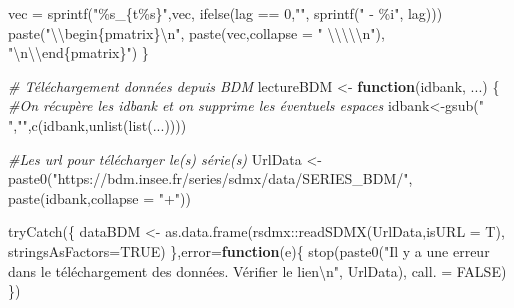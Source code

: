 \documentclass[
  10pt,
]{article}
\newenvironment{Shaded}{\begin{snugshade}}{\end{snugshade}}
\newcommand{\AttributeTok}[1]{\textcolor[rgb]{0.77,0.63,0.00}{#1}}
\newcommand{\CommentTok}[1]{\textcolor[rgb]{0.56,0.35,0.01}{\textit{#1}}}
\newcommand{\ConstantTok}[1]{\textcolor[rgb]{0.00,0.00,0.00}{#1}}
\newcommand{\ControlFlowTok}[1]{\textcolor[rgb]{0.13,0.29,0.53}{\textbf{#1}}}
\newcommand{\DecValTok}[1]{\textcolor[rgb]{0.00,0.00,0.81}{#1}}
\newcommand{\FunctionTok}[1]{\textcolor[rgb]{0.00,0.00,0.00}{#1}}
\newcommand{\NormalTok}[1]{#1}
\newcommand{\OtherTok}[1]{\textcolor[rgb]{0.56,0.35,0.01}{#1}}
\newcommand{\SpecialCharTok}[1]{\textcolor[rgb]{0.00,0.00,0.00}{#1}}
\newcommand{\StringTok}[1]{\textcolor[rgb]{0.31,0.60,0.02}{#1}}
\begin{document}
\begin{Shaded}
\begin{Highlighting}[]
\NormalTok{    vec }\OtherTok{=} \FunctionTok{sprintf}\NormalTok{(}\StringTok{"\%s\_\{t\%s\}"}\NormalTok{,vec,}
                  \FunctionTok{ifelse}\NormalTok{(lag }\SpecialCharTok{==} \DecValTok{0}\NormalTok{,}\StringTok{""}\NormalTok{,}
                         \FunctionTok{sprintf}\NormalTok{(}\StringTok{" {-} \%i"}\NormalTok{, lag)))}
    \FunctionTok{paste}\NormalTok{(}\StringTok{"}\SpecialCharTok{\textbackslash{}\textbackslash{}}\StringTok{begin\{pmatrix\}}\SpecialCharTok{\textbackslash{}n}\StringTok{"}\NormalTok{,}
          \FunctionTok{paste}\NormalTok{(vec,}\AttributeTok{collapse =} \StringTok{" }\SpecialCharTok{\textbackslash{}\textbackslash{}\textbackslash{}\textbackslash{}\textbackslash{}n}\StringTok{"}\NormalTok{),}
          \StringTok{"}\SpecialCharTok{\textbackslash{}n\textbackslash{}\textbackslash{}}\StringTok{end\{pmatrix\}"}\NormalTok{)}
\NormalTok{\}}


\CommentTok{\# Téléchargement données depuis BDM}
\NormalTok{lectureBDM }\OtherTok{\textless{}{-}} \ControlFlowTok{function}\NormalTok{(idbank, ...)}
\NormalTok{\{}
    \CommentTok{\#On récupère les idbank et on supprime les éventuels espaces}
\NormalTok{    idbank}\OtherTok{\textless{}{-}}\FunctionTok{gsub}\NormalTok{(}\StringTok{" "}\NormalTok{,}\StringTok{""}\NormalTok{,}\FunctionTok{c}\NormalTok{(idbank,}\FunctionTok{unlist}\NormalTok{(}\FunctionTok{list}\NormalTok{(...))))}
    
    \CommentTok{\#Les url pour télécharger le(s) série(s)}
\NormalTok{    UrlData }\OtherTok{\textless{}{-}} \FunctionTok{paste0}\NormalTok{(}\StringTok{"https://bdm.insee.fr/series/sdmx/data/SERIES\_BDM/"}\NormalTok{,}
                      \FunctionTok{paste}\NormalTok{(idbank,}\AttributeTok{collapse =} \StringTok{"+"}\NormalTok{))}
    
    \FunctionTok{tryCatch}\NormalTok{(\{}
\NormalTok{        dataBDM }\OtherTok{\textless{}{-}} \FunctionTok{as.data.frame}\NormalTok{(rsdmx}\SpecialCharTok{::}\FunctionTok{readSDMX}\NormalTok{(UrlData,}\AttributeTok{isURL =}\NormalTok{ T),}
                                 \AttributeTok{stringsAsFactors=}\ConstantTok{TRUE}\NormalTok{)}
\NormalTok{    \},}\AttributeTok{error=}\ControlFlowTok{function}\NormalTok{(e)\{}
        \FunctionTok{stop}\NormalTok{(}\FunctionTok{paste0}\NormalTok{(}\StringTok{"Il y a une erreur dans le téléchargement des données. Vérifier le lien}\SpecialCharTok{\textbackslash{}n}\StringTok{"}\NormalTok{,}
\NormalTok{                    UrlData),}
             \AttributeTok{call. =} \ConstantTok{FALSE}\NormalTok{)}
\NormalTok{    \})}
    

\end{Highlighting}
\end{Shaded}
\end{document}
